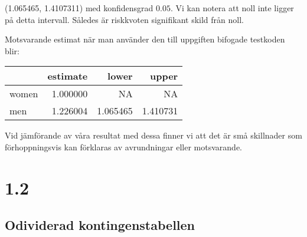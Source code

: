 \documentclass[]{article}
\newenvironment{Shaded}{\begin{snugshade}}{\end{snugshade}}
\newcommand{\CommentTok}[1]{\textcolor[rgb]{0.56,0.35,0.01}{\textit{#1}}}
\newcommand{\DataTypeTok}[1]{\textcolor[rgb]{0.13,0.29,0.53}{#1}}
\newcommand{\KeywordTok}[1]{\textcolor[rgb]{0.13,0.29,0.53}{\textbf{#1}}}
\newcommand{\NormalTok}[1]{#1}
\newcommand{\OperatorTok}[1]{\textcolor[rgb]{0.81,0.36,0.00}{\textbf{#1}}}
\newcommand{\StringTok}[1]{\textcolor[rgb]{0.31,0.60,0.02}{#1}}
\begin{document}
(1.065465, 1.4107311) med konfidensgrad \(0.05\). Vi kan notera att noll
inte ligger på detta intervall. Således är riskkvoten signifikant skild
från noll.

Motsvarande estimat när man använder den till uppgiften bifogade
testkoden blir:

\begin{Shaded}
\end{Shaded}

\begin{longtable}[]{@{}lrrr@{}}
\toprule
& estimate & lower & upper\tabularnewline
\midrule
\endhead
women & 1.000000 & NA & NA\tabularnewline
men & 1.226004 & 1.065465 & 1.410731\tabularnewline
\bottomrule
\end{longtable}

Vid jämförande av våra resultat med dessa finner vi att det är små
skillnader som förhoppningsvis kan förklaras av avrundningar eller
motsvarande.

\hypertarget{section-3}{%
\section{1.2}\label{section-3}}

\hypertarget{odividerad-kontingenstabellen}{%
\subsection{Odividerad
kontingenstabellen}\label{odividerad-kontingenstabellen}}
\end{document}
